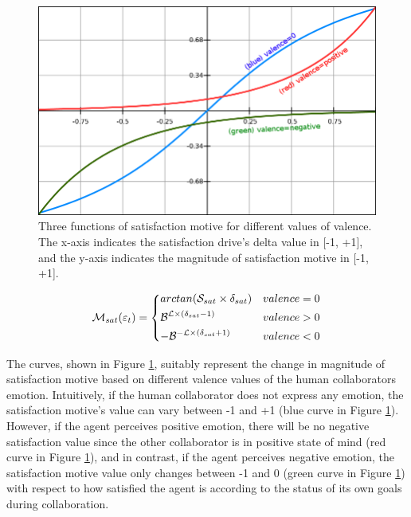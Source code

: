 \documentclass[12pt]{report}
\begin{document}
\begin{figure}[t]
  \centering
  \includegraphics[width=1\textwidth]{figure/satisfaction_motive_functions.png}
  \caption{Three functions of satisfaction motive for different values of
  valence. The x-axis indicates the satisfaction drive's delta value in [-1,
  +1], and the y-axis indicates the magnitude of satisfaction motive in [-1,
  +1].}
  \label{fig:satisfaction-motive-functions}
\end{figure}

\begin{equation}
    \mathcal{M}_{sat}(\varepsilon_t)= 
    \begin{dcases}
       arctan (\mathcal{S}_{sat} \times \delta_{sat})      & valence = 0 \\
       \mathcal{B}^{\mathcal{L} \times (\delta_{sat}-1)}   & valence > 0 \\
       -\mathcal{B}^{-\mathcal{L} \times (\delta_{sat}+1)} & valence < 0
    \end{dcases}
    \label{eqn:satisfaction_motive}
\end{equation}

The curves, shown in Figure \ref{fig:satisfaction-motive-functions},
suitably represent the change in magnitude of satisfaction motive based on
different valence values of the human collaborators emotion.
Intuitively, if the human collaborator does not express any emotion, the
satisfaction motive's value can vary between -1 and +1 (blue curve in Figure
\ref{fig:satisfaction-motive-functions}). However, if the agent perceives
positive emotion, there will be no negative satisfaction value since the other
collaborator is in positive state of mind (red curve in Figure
\ref{fig:satisfaction-motive-functions}), and in contrast, if the agent
perceives negative emotion, the satisfaction motive value only changes between
-1 and 0 (green curve in Figure \ref{fig:satisfaction-motive-functions}) with
respect to how satisfied the agent is according to the status of its own goals
during collaboration.
\end{document}
